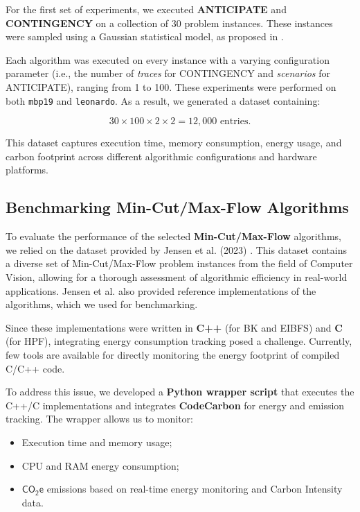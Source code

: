 \documentclass[a4paper,singleside,12pt]{report} %
\begin{document}
For the first set of experiments, we executed \textbf{ANTICIPATE} and \textbf{CONTINGENCY} on a collection of 30 problem instances. These instances were sampled using a Gaussian statistical 
model, as proposed in \cite{DEFILIPPO2022109199}. 

Each algorithm was executed on every instance with a varying configuration parameter (i.e., the number of \textit{traces} for CONTINGENCY and \textit{scenarios} for ANTICIPATE), ranging 
from 1 to 100. These experiments were performed on both \verb|mbp19| and \verb|leonardo|. As a result, we generated a dataset containing:

\begin{equation}
    30 \times 100 \times 2 \times 2 = 12,000 \text{ entries}.
\end{equation}

This dataset captures execution time, memory consumption, energy usage, and carbon footprint across different algorithmic configurations and hardware platforms.

\subsection{Benchmarking Min-Cut/Max-Flow Algorithms}

To evaluate the performance of the selected \textbf{Min-Cut/Max-Flow} algorithms, we relied on the dataset provided by Jensen et al. (2023) \cite{Jensen2023Maxflow}. This dataset contains a 
diverse set of Min-Cut/Max-Flow problem instances from the field of Computer Vision, allowing for a thorough assessment of algorithmic efficiency in real-world applications. Jensen et al. also
provided reference implementations of the algorithms, which we used for benchmarking.

Since these implementations were written in \textbf{C++} (for BK and EIBFS) and \textbf{C} (for HPF), integrating energy consumption tracking posed a challenge. Currently, few tools are 
available for directly monitoring the energy footprint of compiled C/C++ code. %

To address this issue, we developed a \textbf{Python wrapper script} that executes the C++/C implementations and integrates \textbf{CodeCarbon} for energy and emission tracking. The wrapper 
allows us to monitor:
\begin{itemize}
    \item Execution time and memory usage;
    \item CPU and RAM energy consumption;
    \item $\mathsf{CO_2e}$ emissions based on real-time energy monitoring and Carbon Intensity data.
\end{itemize}
\end{document}
